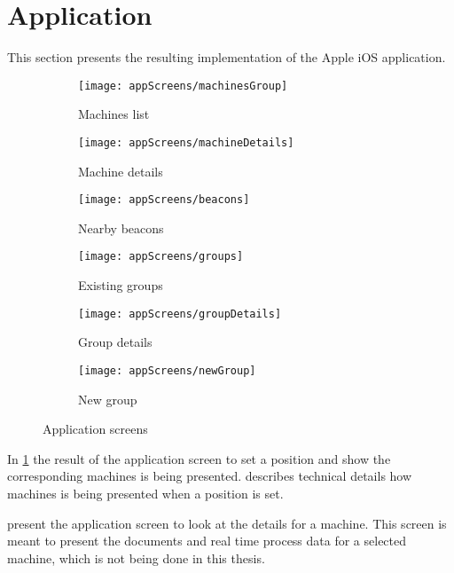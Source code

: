 \section{Application}\label{sec:resultApp}
This section presents the resulting implementation of the Apple iOS application.

\begin{figure}[H]
	\centering
	\begin{subfigure}[t]{0.3\textwidth}
		\centering	
		\texttt{[image: appScreens/machinesGroup]}
		\caption{Machines list}
		\label{subfig:machinesList}
	\end{subfigure}%
	\begin{subfigure}[t]{0.3\textwidth}
		\centering	
		\texttt{[image: appScreens/machineDetails]}
		\caption{Machine details}
		\label{subfig:machineDetails}
	\end{subfigure}
	\begin{subfigure}[t]{0.3\textwidth}
		\centering	
		\texttt{[image: appScreens/beacons]}
		\caption{Nearby beacons}
		\label{subfig:nearbyBeacons}
	\end{subfigure}
	\begin{subfigure}[t]{0.3\textwidth}
		\centering	
		\texttt{[image: appScreens/groups]}
		\caption{Existing groups}
		\label{subfig:existingGroups}
	\end{subfigure}
	\begin{subfigure}[t]{0.3\textwidth}
		\centering	
		\texttt{[image: appScreens/groupDetails]}
		\caption{Group details}
		\label{subfig:groupDetails}
	\end{subfigure}
	\begin{subfigure}[t]{0.3\textwidth}
		\centering	
		\texttt{[image: appScreens/newGroup]}
		\caption{New group}
		\label{subfig:newGroup}
	\end{subfigure}

	\caption{Application screens}
	\label{fig:appScreens}

\end{figure}

In \cref{subfig:machinesList} the result of the application screen to set a position and show the corresponding machines is being presented.
 describes technical details how machines is being presented when a position is set.

\bigskip

 present the application screen to look at the details for a machine.
This screen is meant to present the documents and real time process data for a selected machine, which is not being done in this thesis. 

